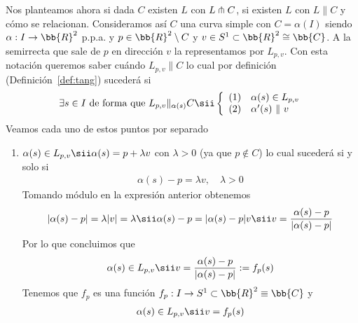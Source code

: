 \begin{observacion}
    Nos planteamos ahora si dada $C$ existen $L$ con $L\pitchfork C$, si existen $L$ con $L\|C$ y cómo se relacionan. Consideramos así $C$ una curva simple con $C=\alpha(I)$ siendo $\alpha: I \to \bb{R}^2$ p.p.a. y $p\in \bb{R}^2 \setminus C$ y $v\in S^1\subset \bb{R}^2 \cong \bb{C}$. A la semirrecta que sale de $p$ en dirección $v$ la representamos por $L_{p,v}$. Con esta notación queremos saber cuándo $L_{p,v} \| C$ lo cual por definición (Definición~\ref{def:tang}) sucederá si
    \begin{gather*}
        \exists s \in I \text{ de forma que } L_{p,v} \|_{\alpha(s)} C \sii \left\{ 
            \begin{array}{c l}
                (1) & \alpha(s)\in L_{p,v}\\
                (2) & \alpha'(s)\ \| \ v
            \end{array}
        \right.
    \end{gather*}
    Veamos cada uno de estos puntos por separado
    \begin{enumerate}[label=(\arabic*)]
        \item $\alpha(s) \in L_{p,v} \sii \alpha(s) = p + \lambda v$ con $\lambda > 0$ (ya que $p\notin C$) lo cual sucederá si y solo si 
        \begin{gather*}
            \alpha(s) - p = \lambda v,\quad \lambda > 0
        \end{gather*}
        Tomando módulo en la expresión anterior obtenemos
        \begin{gather*}
            |\alpha(s) - p| = \lambda |v| = \lambda \sii \alpha(s) - p = |\alpha(s) - p |v \sii v = \frac{\alpha(s)-p}{|\alpha(s)-p|}
        \end{gather*}
        Por lo que concluimos que 
        \begin{gather*}
            \alpha(s) \in L_{p,v} \sii v = \frac{\alpha(s)-p}{|\alpha(s)-p|} := f_p(s)
        \end{gather*}
        Tenemos que $f_p$ es una función $f_p:I \to S^1 \subset \bb{R}^2 \equiv \bb{C}$ y
        \begin{gather*}
            \alpha(s) \in L_{p,v} \sii v = f_p(s)
        \end{gather*}


\end{enumerate}
\end{observacion}
